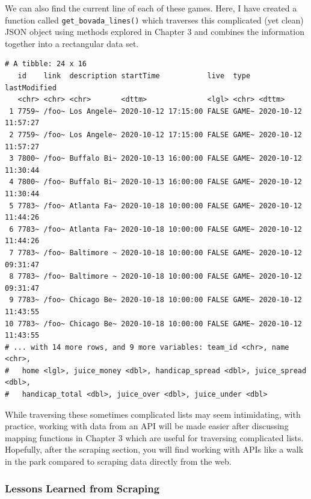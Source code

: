 \documentclass[
]{article}
\newenvironment{Shaded}{\begin{snugshade}}{\end{snugshade}}
\newcommand{\DataTypeTok}[1]{\textcolor[rgb]{0.13,0.29,0.53}{#1}}
\newcommand{\DecValTok}[1]{\textcolor[rgb]{0.00,0.00,0.81}{#1}}
\newcommand{\KeywordTok}[1]{\textcolor[rgb]{0.13,0.29,0.53}{\textbf{#1}}}
\newcommand{\NormalTok}[1]{#1}
\newcommand{\OperatorTok}[1]{\textcolor[rgb]{0.81,0.36,0.00}{\textbf{#1}}}
\newcommand{\StringTok}[1]{\textcolor[rgb]{0.31,0.60,0.02}{#1}}
\begin{document}
We can also find the current line of each of these games. Here, I have created a function called \texttt{get\_bovada\_lines()} which traverses this complicated (yet clean) JSON object using methods explored in Chapter 3 and combines the information together into a rectangular data set.

\begin{Shaded}
\end{Shaded}

\begin{verbatim}
# A tibble: 24 x 16
   id    link  description startTime           live  type  lastModified       
   <chr> <chr> <chr>       <dttm>              <lgl> <chr> <dttm>             
 1 7759~ /foo~ Los Angele~ 2020-10-12 17:15:00 FALSE GAME~ 2020-10-12 11:57:27
 2 7759~ /foo~ Los Angele~ 2020-10-12 17:15:00 FALSE GAME~ 2020-10-12 11:57:27
 3 7800~ /foo~ Buffalo Bi~ 2020-10-13 16:00:00 FALSE GAME~ 2020-10-12 11:30:44
 4 7800~ /foo~ Buffalo Bi~ 2020-10-13 16:00:00 FALSE GAME~ 2020-10-12 11:30:44
 5 7783~ /foo~ Atlanta Fa~ 2020-10-18 10:00:00 FALSE GAME~ 2020-10-12 11:44:26
 6 7783~ /foo~ Atlanta Fa~ 2020-10-18 10:00:00 FALSE GAME~ 2020-10-12 11:44:26
 7 7783~ /foo~ Baltimore ~ 2020-10-18 10:00:00 FALSE GAME~ 2020-10-12 09:31:47
 8 7783~ /foo~ Baltimore ~ 2020-10-18 10:00:00 FALSE GAME~ 2020-10-12 09:31:47
 9 7783~ /foo~ Chicago Be~ 2020-10-18 10:00:00 FALSE GAME~ 2020-10-12 11:43:55
10 7783~ /foo~ Chicago Be~ 2020-10-18 10:00:00 FALSE GAME~ 2020-10-12 11:43:55
# ... with 14 more rows, and 9 more variables: team_id <chr>, name <chr>,
#   home <lgl>, juice_money <dbl>, handicap_spread <dbl>, juice_spread <dbl>,
#   handicap_total <dbl>, juice_over <dbl>, juice_under <dbl>
\end{verbatim}

While traversing these sometimes complicated lists may seem intimidating, with practice, working with data from an API will be made easier after discussing mapping functions in Chapter 3 which are useful for traversing complicated lists. Hopefully, after the scraping section, you will find working with APIs like a walk in the park compared to scraping data directly from the web.

\hypertarget{LessonsLearnedFromScraping}{%
\subsubsection{Lessons Learned from Scraping}\label{LessonsLearnedFromScraping}}
\end{document}
